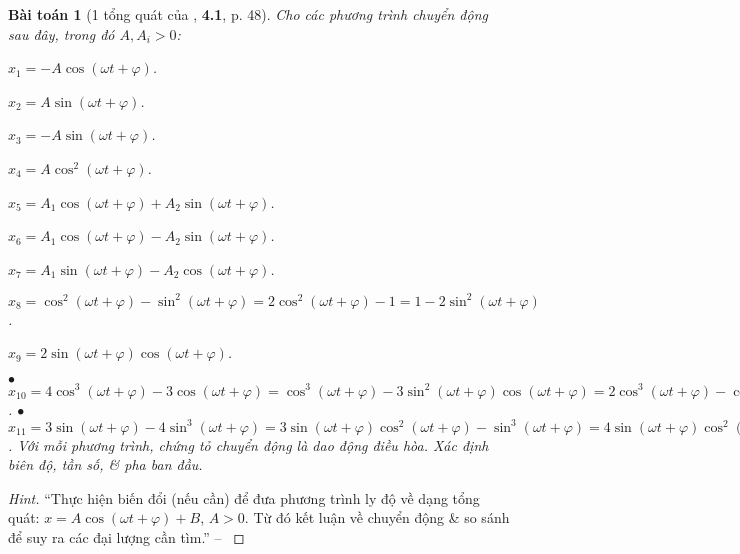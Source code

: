 \documentclass{article}
\numberwithin{equation}{section}
\newtheorem{baitoan}{Bài toán}[section]
\begin{document}
\begin{baitoan}[1 tổng quát của \cite{Giai_Toan_Trac_Nghiem_Vat_Ly_12_tap_1}, \textbf{4.1}, p. 48]
	Cho các phương trình chuyển động sau đây, trong đó $A,A_i > 0$:
	\begin{enumerate*}
		\item[$\bullet$] $x_1 = -A\cos(\omega t + \varphi)$.
		\item[$\bullet$] $x_2 = A\sin(\omega t + \varphi)$.
		\item[$\bullet$] $x_3 = -A\sin(\omega t + \varphi)$.
		\item[$\bullet$] $x_4 = A\cos^2(\omega t + \varphi)$.
		\item[$\bullet$] $x_5 = A_1\cos(\omega t + \varphi) + A_2\sin(\omega t + \varphi)$.
		\item[$\bullet$] $x_6 = A_1\cos(\omega t + \varphi) - A_2\sin(\omega t + \varphi)$.
		\item[$\bullet$] $x_7 = A_1\sin(\omega t + \varphi) - A_2\cos(\omega t + \varphi)$.
		\item[$\bullet$] $x_8 = \cos^2(\omega t + \varphi) - \sin^2(\omega t + \varphi) = 2\cos^2(\omega t + \varphi) - 1 = 1 - 2\sin^2(\omega t + \varphi)$.
		\item[$\bullet$] $x_9 = 2\sin(\omega t + \varphi)\cos(\omega t + \varphi)$.
	\end{enumerate*}
	$\bullet$ $x_{10} = 4\cos^3(\omega t + \varphi) - 3\cos(\omega t + \varphi) = \cos^3(\omega t + \varphi) - 3\sin^2(\omega t + \varphi)\cos(\omega t + \varphi) = 2\cos^3(\omega t + \varphi) - \cos(\omega t + \varphi) - 2\sin^2(\omega t + \varphi)\cos(\omega t + \varphi) = \cos(\omega t + \varphi) - 4\sin^2(\omega t + \varphi)\cos(\omega t + \varphi)$. $\bullet$ $x_{11} = 3\sin(\omega t + \varphi) - 4\sin^3(\omega t + \varphi) = 3\sin(\omega t + \varphi)\cos^2(\omega t + \varphi) - \sin^3(\omega t + \varphi) = 4\sin(\omega t + \varphi)\cos^2(\omega t + \varphi) - \sin(\omega t + \varphi) = \sin(\omega t + \varphi) - 2\sin^3(\omega t + \varphi) + 2\sin(\omega t + \varphi)\cos^2(\omega t + \varphi)$. Với mỗi phương trình, chứng tỏ chuyển động là dao động điều hòa. Xác định biên độ, tần số, \& pha ban đầu.
\end{baitoan}

\begin{proof}[Hint]
	``Thực hiện biến đổi (nếu cần) để đưa phương trình ly độ về dạng tổng quát: $x = A\cos(\omega t + \varphi) + B$, $A > 0$. Từ đó kết luận về chuyển động \& so sánh để suy ra các đại lượng cần tìm.'' -- \cite[p. 48]{Giai_Toan_Trac_Nghiem_Vat_Ly_12_tap_1}
\end{proof}
\end{document}
